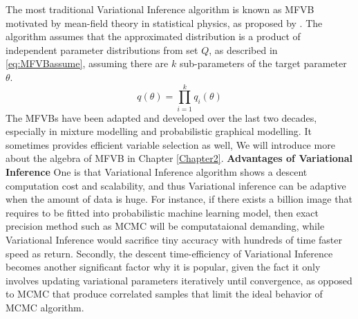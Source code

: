 The most traditional Variational Inference algorithm is known as MFVB motivated by mean-field theory in statistical physics, as proposed by 
\cite{parisi1988statistical}. The algorithm assumes that the approximated distribution is
a product of independent parameter distributions from set $Q$, as described in \autoref{eq:MFVBassume}, assuming there are $k$ sub-parameters of the target parameter $\theta$.
\begin{equation}
	\label{eq:MFVBassume}
	q(\theta) = \prod_{i=1}^{k} q_i(\theta)
\end{equation}
The MFVBs have been adapted and developed over the last two decades, especially in mixture modelling and probabilistic graphical modelling. It sometimes provides efficient variable selection as well, We will introduce more about the algebra of MFVB in Chapter \ref{Chapter2}. 
\textbf{Advantages of Variational Inference}
 One is that Variational Inference algorithm shows a descent computation cost and scalability, and thus Variational inference can be adaptive when the amount of data is huge. For instance, if there exists a billion image that requires to be fitted into probabilistic machine learning model, then exact precision method such as MCMC will be computataional demanding, while Variational Inference would sacrifice tiny accuracy with hundreds of time faster speed as return.
Secondly, the descent time-efficiency of Variational Inference becomes another significant factor why it is popular, given the fact it only involves updating variational parameters iteratively until convergence, as opposed to MCMC that produce correlated samples that limit the ideal behavior of MCMC algorithm.


